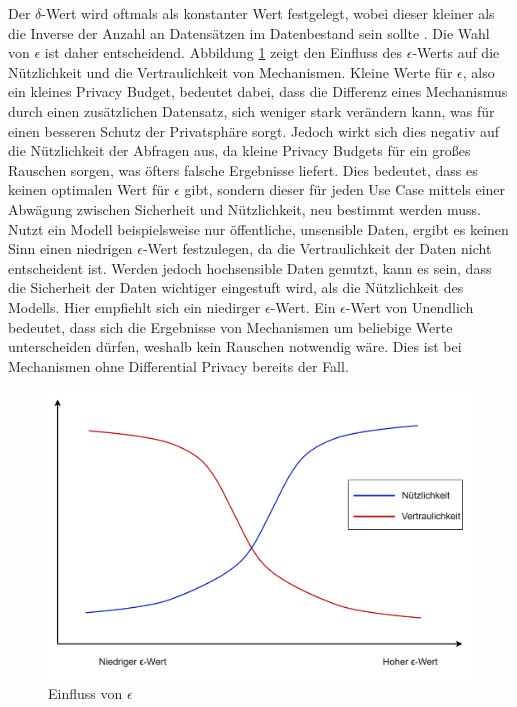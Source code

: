 Der $\delta$-Wert wird oftmals als konstanter Wert festgelegt, wobei dieser kleiner als die Inverse der Anzahl an Datensätzen im Datenbestand sein sollte \cite{P-27}.
Die Wahl von $\epsilon$ ist daher entscheidend. 
Abbildung \ref{fig:dp_privacy_budget} zeigt den Einfluss des $\epsilon$-Werts auf die Nützlichkeit und die Vertraulichkeit von Mechanismen.
Kleine Werte für $\epsilon$, also ein kleines Privacy Budget, bedeutet dabei, dass die Differenz eines Mechanismus durch einen zusätzlichen Datensatz, sich weniger stark verändern kann, was für einen besseren Schutz der Privatsphäre sorgt.
Jedoch wirkt sich dies negativ auf die Nützlichkeit der Abfragen aus, da kleine Privacy Budgets für ein großes Rauschen sorgen, was öfters falsche Ergebnisse liefert.
Dies bedeutet, dass es keinen optimalen Wert für $\epsilon$ gibt, sondern dieser für jeden Use Case mittels einer Abwägung zwischen Sicherheit und Nützlichkeit, neu bestimmt werden muss.
Nutzt ein Modell beispielsweise nur öffentliche, unsensible Daten, ergibt es keinen Sinn einen niedrigen $\epsilon$-Wert festzulegen, da die Vertraulichkeit der Daten nicht entscheident ist.
Werden jedoch hochsensible Daten genutzt, kann es sein, dass die Sicherheit der Daten wichtiger eingestuft wird, als die Nützlichkeit des Modells. 
Hier empfiehlt sich ein niedirger $\epsilon$-Wert.
Ein $\epsilon$-Wert von Unendlich bedeutet, dass sich die Ergebnisse von Mechanismen um beliebige Werte unterscheiden dürfen, weshalb kein Rauschen notwendig wäre. 
Dies ist bei Mechanismen ohne Differential Privacy bereits der Fall.

\begin{figure}[!htb]
    \centering
    \includegraphics[width=12cm]{figures/dp_privacy_budget.png}
    \caption{Einfluss von $\epsilon$}
    \label{fig:dp_privacy_budget}
\end{figure} 

